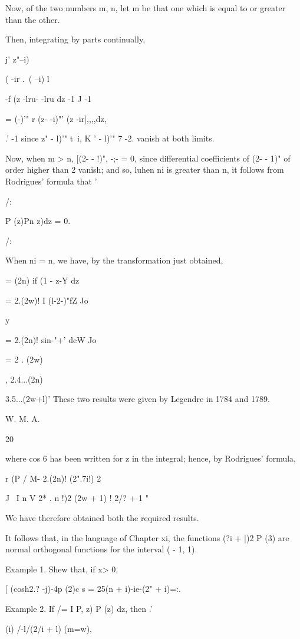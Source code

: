 {Now, of the two numbers m, n, let m be that one which is equal to or
greater than the other.

Then, integrating by parts continually,

j' z"--i)%

 ( -ir .\, ( --i) l

-f (z -lru- -lru dz -1 J -1

= (-)'" r (z- -i)"' (z -ir],,,,dz,

.' -1 since z" - l)'" t\ i, K ' - l)'" 7 -2.  vanish at both
limits.

Now, when m > n, [(2- - !)", -;- = 0, since differential coefficients
of (2- - 1)" of order higher than 2 vanish; and so, luhen ni is
greater than n, it follows from Rodrigues' formula that '

/:

P (z)Pn z)dz = 0.

/:

When ni = n, we have, by the transformation just obtained,

= (2n) if (1 - z-Y dz

= 2.(2w)! I (l-2-)"fZ Jo

y

= 2.(2n)! sin-"+' dcW Jo

= 2 . (2w)

, 2.4...(2n)

3.5...(2w+l)' These two results were given by Legendre in 1784 and
1789.

W. M. A.

20

%
%

where cos 6 has been written for z in the integral; hence, by
Rodrigues' formula,

r (P / M- 2.(2n)! (2".7i!) 2

J \ I n V 2* . n !)2 (2w + 1) ! 2/? + 1 "

We have therefore obtained both the required results.

It follows that, in the language of Chapter xi, the functions (?i +
|)2 P (3) are normal orthogonal functions for the interval ( - 1, 1).

Example 1. Shew that, if x> 0,

[ (cosh2.? -j)-4p (2)c s = 25(n + i)-ie-(2" + i)=:.

Example 2. If /= I P, z) P (z) dz, then .'


(i) /-l/(2/i + l) (m=w),

}
